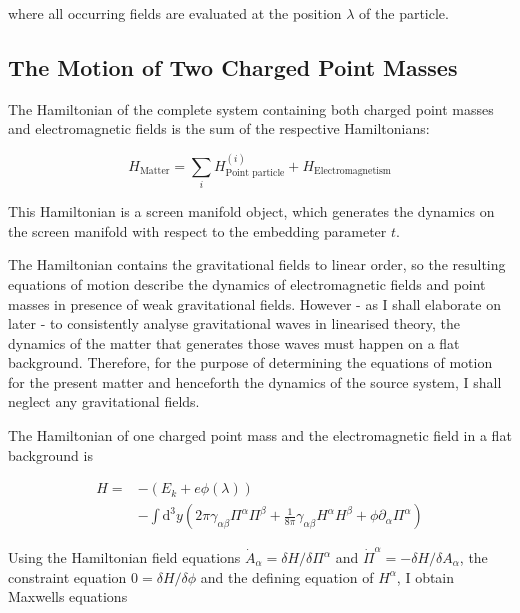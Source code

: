 \documentclass[11pt]{article}
\begin{document}
where all occurring fields are evaluated at the position $\lambda$ of the particle.

\subsection{The Motion of Two Charged Point Masses} \label{sec_mot_bin}

The Hamiltonian of the complete system containing both charged point masses and electromagnetic fields is the sum of the respective Hamiltonians:

\begin{equation}
	H_{\text{Matter}}  = \sum_i H^{(i)}_{\text{Point particle}} + H_{\text{Electromagnetism}}
\end{equation}


This Hamiltonian is a screen manifold object, which generates the dynamics on the screen manifold with respect to the embedding parameter $t$.

The Hamiltonian contains the gravitational fields to linear order, so the resulting equations of motion describe the dynamics of electromagnetic fields and point masses in presence of weak gravitational fields. However - as I shall elaborate on later - to consistently analyse gravitational waves in linearised theory, the dynamics of the matter that generates those waves must happen on a flat background. Therefore, for the purpose of determining the equations of motion for the present matter and henceforth the dynamics of the source system, I shall neglect any gravitational fields. 

The Hamiltonian of one charged point mass and the electromagnetic field in a flat background is

\begin{equation}
\begin{split}
		H = &- \left(E_k + e \phi \left( \lambda \right) \right)\\
		&- \int \mathrm{d}^3 y \left( 2 \pi \gamma_{\alpha \beta} \Pi^\alpha \Pi^\beta + \frac{1}{8 \pi}\gamma_{\alpha \beta} H^\alpha H^\beta
		+ \phi \partial_\alpha \Pi^\alpha \right)
\end{split}
\end{equation}

Using the Hamiltonian field equations $\dot{A}_\alpha = \delta H / \delta \Pi^\alpha$ and $\dot{\Pi}^\alpha = -\delta H / \delta A_\alpha$,  the constraint equation $0 = \delta H / \delta \phi$ and the defining equation of $H^\alpha$,  I obtain Maxwells equations
\end{document}
